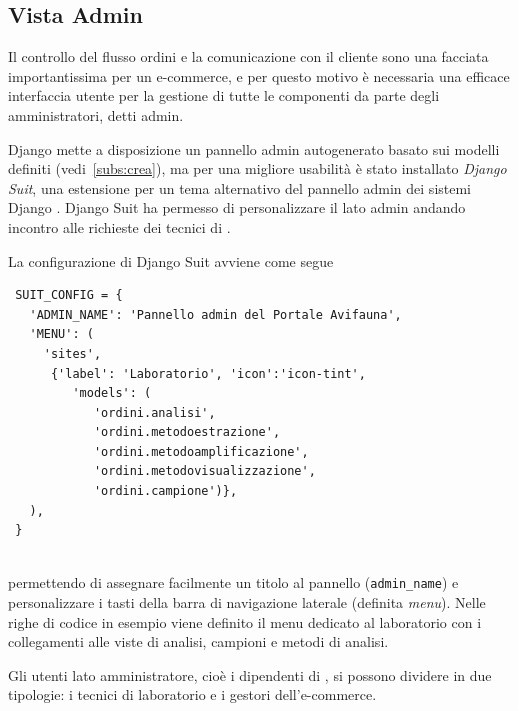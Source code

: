 \newpage
\subsection{Vista Admin}
\label{subs:admin}


Il controllo del flusso ordini e la comunicazione con il cliente sono una facciata importantissima per un e-commerce, e per questo motivo è necessaria una efficace interfaccia utente per la gestione di tutte le componenti da parte degli amministratori, detti admin.

Django mette a disposizione un pannello admin autogenerato basato sui modelli definiti (vedi~\ref{subs:crea}), ma per una migliore usabilità è stato installato \emph{Django Suit}, una estensione per un tema alternativo del pannello admin dei sistemi Django \cite{suit}. Django Suit ha permesso di personalizzare il lato admin andando incontro alle richieste dei tecnici di {\fem}.

La configurazione di Django Suit avviene come segue
\begin{footnotesize}
\begin{verbatim}
 SUIT_CONFIG = {
   'ADMIN_NAME': 'Pannello admin del Portale Avifauna',
   'MENU': (
     'sites',
      {'label': 'Laboratorio', 'icon':'icon-tint', 
         'models': (
            'ordini.analisi', 
            'ordini.metodoestrazione', 
            'ordini.metodoamplificazione', 
            'ordini.metodovisualizzazione', 
            'ordini.campione')},
   ),
 }
 
\end{verbatim}
\end{footnotesize}

permettendo di assegnare facilmente un titolo al pannello (\texttt{admin\_name}) e personalizzare i tasti della barra di navigazione laterale (definita \emph{menu}). Nelle righe di codice in esempio viene definito il menu dedicato al laboratorio con i collegamenti alle viste di analisi, campioni e metodi di analisi.

Gli utenti lato amministratore, cioè i dipendenti di {\fem}, si possono dividere in due tipologie: i tecnici di laboratorio e i gestori dell'e-commerce.

